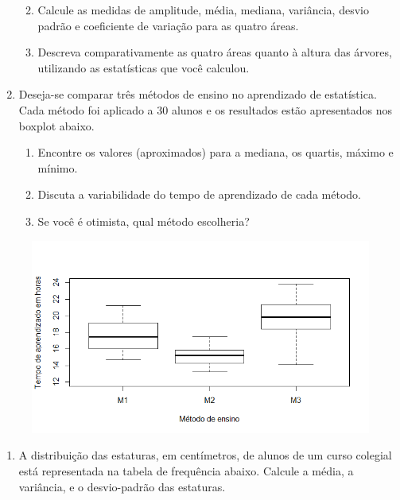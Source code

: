 \documentclass[]{article}
\providecommand{\tightlist}{%
  \setlength{\itemsep}{0pt}\setlength{\parskip}{0pt}}
\begin{document}
\begin{enumerate}
  \begin{enumerate}
  \def\labelenumii{(\alph{enumii})}
  \tightlist
  \item
    Calcule as medidas de amplitude, média, mediana, variância, desvio
    padrão e coeficiente de variação para as quatro áreas.
  \item
    Descreva comparativamente as quatro áreas quanto à altura das
    árvores, utilizando as estatísticas que você calculou.
  \end{enumerate}
\item
  Deseja-se comparar três métodos de ensino no aprendizado de
  estatística. Cada método foi aplicado a 30 alunos e os resultados
  estão apresentados nos boxplot abaixo.

  \begin{enumerate}
  \def\labelenumii{(\alph{enumii})}
  \tightlist
  \item
    Encontre os valores (aproximados) para a mediana, os quartis, máximo
    e mínimo.
  \item
    Discuta a variabilidade do tempo de aprendizado de cada método.
  \item
    Se você é otimista, qual método escolheria?
  \end{enumerate}
\end{enumerate}

\begin{figure}[H]
\centering
\includegraphics[]{ex3.PNG}
\end{figure}

\begin{enumerate}
\def\labelenumi{\arabic{enumi}.}
\setcounter{enumi}{3}
\tightlist
\item
  A distribuição das estaturas, em centímetros, de alunos de um curso
  colegial está representada na tabela de frequência abaixo. Calcule a
  média, a variância, e o desvio-padrão das estaturas.
\end{enumerate}
\end{document}
